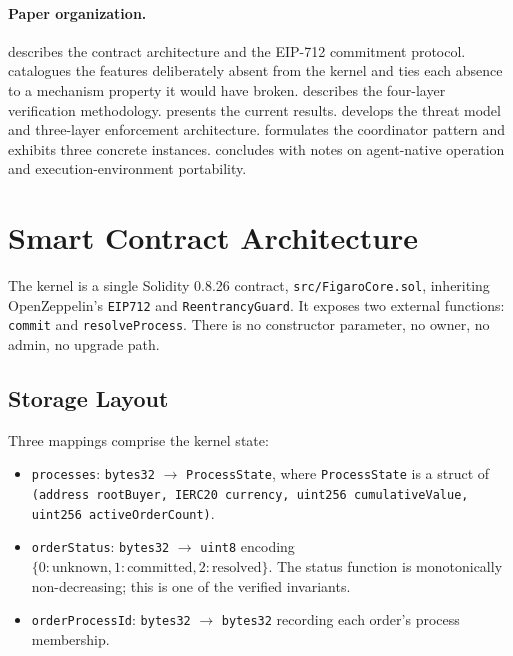 \documentclass[11pt,a4paper]{article}
\theoremstyle{definition}
\theoremstyle{remark}
\begin{document}
\paragraph{Paper organization.}
 describes the contract architecture and the
EIP-712 commitment protocol.  catalogues the
features deliberately absent from the kernel and ties each absence
to a mechanism property it would have broken.
 describes the four-layer verification
methodology.  presents the current
results.  develops the threat model and
three-layer enforcement architecture.
 formulates the coordinator pattern and
exhibits three concrete instances.  concludes
with notes on agent-native operation and execution-environment
portability.

\section{Smart Contract Architecture}
\label{sec:architecture}

The kernel is a single Solidity 0.8.26 contract,
\texttt{src/FigaroCore.sol}, inheriting OpenZeppelin's \texttt{EIP712}
and \texttt{ReentrancyGuard}. It exposes two external functions:
\texttt{commit} and \texttt{resolveProcess}. There is no constructor
parameter, no owner, no admin, no upgrade path.

\subsection{Storage Layout}

Three mappings comprise the kernel state:
\begin{itemize}
  \item \texttt{processes}: \texttt{bytes32} $\to$
    \texttt{ProcessState}, where \texttt{ProcessState} is a struct of
    \texttt{(address rootBuyer, IERC20 currency, uint256
    cumulativeValue, uint256 activeOrderCount)}.
  \item \texttt{orderStatus}: \texttt{bytes32} $\to$ \texttt{uint8}
    encoding $\{0:\text{unknown}, 1:\text{committed},
    2:\text{resolved}\}$. The status function is monotonically
    non-decreasing; this is one of the verified invariants.
  \item \texttt{orderProcessId}: \texttt{bytes32} $\to$
    \texttt{bytes32} recording each order's process membership.
\end{itemize}
\end{document}
